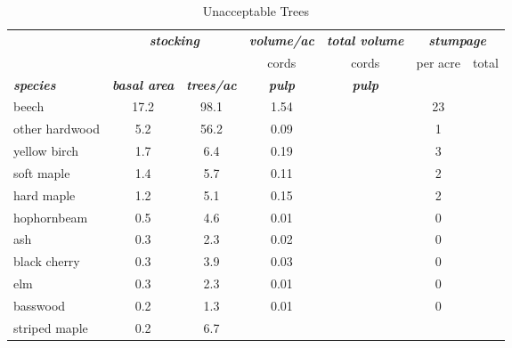 \documentclass[landscape]{article}
\begin{document}
\begin{table}[H]

\caption{\label{tab:unnamed-chunk-8}Unacceptable Trees}
\fontsize{10}{12}\selectfont
\begin{tabular}[t]{lcccccc}
\toprule
\multicolumn{1}{c}{\em{\textbf{ }}} & \multicolumn{2}{c}{\em{\textbf{stocking}}} & \multicolumn{1}{c}{\em{\textbf{volume/ac }}} & \multicolumn{1}{c}{\em{\textbf{total volume}}} & \multicolumn{2}{c}{\em{\textbf{stumpage}}} \\
\cmidrule(l{3pt}r{3pt}){2-3} \cmidrule(l{3pt}r{3pt}){4-4} \cmidrule(l{3pt}r{3pt}){5-5} \cmidrule(l{3pt}r{3pt}){6-7}
\multicolumn{3}{c}{ } & \multicolumn{1}{c}{cords} & \multicolumn{1}{c}{cords} & \multicolumn{1}{c}{per acre} & \multicolumn{1}{c}{total} \\
\cmidrule(l{3pt}r{3pt}){4-4} \cmidrule(l{3pt}r{3pt}){5-5} \cmidrule(l{3pt}r{3pt}){6-6} \cmidrule(l{3pt}r{3pt}){7-7}
\rowcolor[HTML]{DCDCDC}  \em{\textbf{species}} & \em{\textbf{basal area}} & \em{\textbf{trees/ac}} & \em{\textbf{pulp}} & \em{\textbf{pulp}} & \em{\textbf{ }} & \em{\textbf{ }}\\
\midrule
\rowcolor{gray!6}  beech & 17.2 & 98.1 & 1.54 &  & 23 & \\
 
other hardwood & 5.2 & 56.2 & 0.09 &  & 1 & \\
 
\rowcolor{gray!6}  yellow birch & 1.7 & 6.4 & 0.19 &  & 3 & \\
 
soft maple & 1.4 & 5.7 & 0.11 &  & 2 & \\
 
\rowcolor{gray!6}  hard maple & 1.2 & 5.1 & 0.15 &  & 2 & \\
 
hophornbeam & 0.5 & 4.6 & 0.01 &  & 0 & \\
 
\rowcolor{gray!6}  ash & 0.3 & 2.3 & 0.02 &  & 0 & \\
 
black cherry & 0.3 & 3.9 & 0.03 &  & 0 & \\
 
\rowcolor{gray!6}  elm & 0.3 & 2.3 & 0.01 &  & 0 & \\
 
basswood & 0.2 & 1.3 & 0.01 &  & 0 & \\
 
\rowcolor{gray!6}  striped maple & 0.2 & 6.7 &  &  &  & \\
 

\end{tabular}
\end{table}
\end{document}
